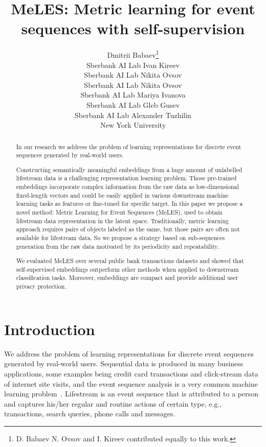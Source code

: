 \documentclass{article}
\title{MeLES: Metric learning for event sequences with self-supervision}
\author{
Dmitrii Babaev\thanks{D. Babaev N. Ovsov and I. Kireev contributed equally to this work.} \\
Sberbank AI Lab
\And
Ivan Kireev \\
Sberbank AI Lab
\And
Nikita Ovsov \\
Sberbank AI Lab
\And
Nikita Ovsov \\
Sberbank AI Lab
\And
Mariya Ivanova \\
Sberbank AI Lab
\And
Gleb Gusev \\
Sberbank AI Lab
\And
Alexander Tuzhilin \\
New York University
}
\begin{document}
\maketitle

\begin{abstract}

In our research we address the problem of learning representations for discrete event sequences generated by real-world users.

Constructing semantically meaningful embeddings from a huge amount of unlabelled lifestream data is a challenging representation learning problem. Those pre-trained embeddings incorporate complex information from the raw data as low-dimensional fixed-length vectors and could be easily applied in various downstream machine learning tasks as features or fine-tuned for specific target. In this paper we propose a novel method: Metric Learning for Event Sequences (MeLES), used to obtain lifestream data representation in the latent space. Traditionally, metric learning approach requires pairs of objects labeled as the same, but those pairs are often not available for lifestream data. So we propose a strategy based on sub-sequences generation from the raw data motivated by its periodicity and repeatability.

We evaluated MeLES over several public bank transactions datasets and showed that self-supervised embeddings outperform other methods when applied to downstream classification tasks. Moreover, embeddings are compact and provide additional user privacy protection.

\end{abstract}

\section{Introduction} \label{sec-intro}

We address the problem of learning representations for discrete event sequences generated by real-world users. Sequential data is produced in many business applications, some examples being credit card transactions and click-stream data of internet site visits, and the event sequence analysis is a very common machine learning problem~\cite{Laxman2008StreamPU, Wiese2009CreditCT, Zhang2017CreditRA, Bigon2019PredictionIV}. Lifestream is an event sequence that is attributed to a person and captures his/her regular and routine actions of certain type, e.g., transactions, search queries, phone calls and messages.
\end{document}
